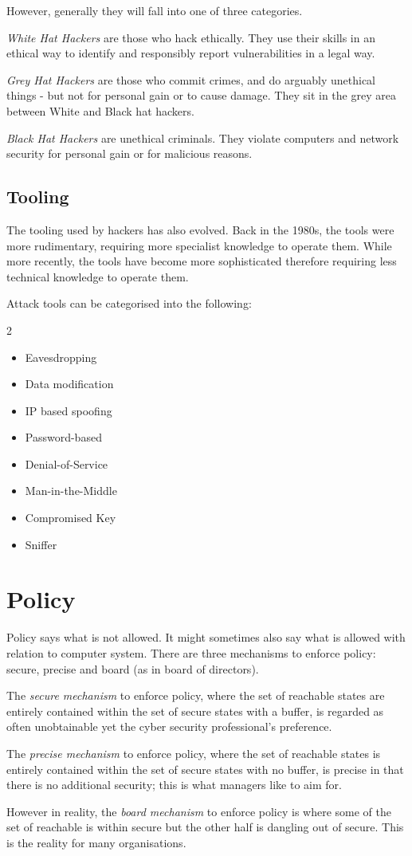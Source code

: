 However, generally they will fall into one of three categories.

\textit{White Hat Hackers} are those who hack ethically. They use their skills in an ethical way to identify and responsibly report vulnerabilities in a legal way.

\textit{Grey Hat Hackers} are those who commit crimes, and do arguably unethical things - but not for personal gain or to cause damage. They sit in the grey area between White and Black hat hackers. 

\textit{Black Hat Hackers} are unethical criminals. They violate computers and network security for personal gain or for malicious reasons.

\subsection{Tooling}
The tooling used by hackers has also evolved. Back in the 1980s, the tools were more rudimentary, requiring more specialist knowledge to operate them. While more recently, the tools have become more sophisticated therefore requiring less technical knowledge to operate them. 

Attack tools can be categorised into the following:
\begin{multicols}{2}
    \begin{itemize}
        \item Eavesdropping
        \item Data modification
        \item IP based spoofing
        \item Password-based
        \item Denial-of-Service
        \item Man-in-the-Middle
        \item Compromised Key
        \item Sniffer
    \end{itemize}
\end{multicols}

\section{Policy}
Policy says what is not allowed. It might sometimes also say what is allowed with relation to computer system. There are three mechanisms to enforce policy: secure, precise and board (as in board of directors). 

The \textit{secure mechanism} to enforce policy, where the set of reachable states are entirely contained within the set of secure states with a buffer, is regarded as often unobtainable yet the cyber security professional's preference.

The \textit{precise mechanism} to enforce policy, where the set of reachable states is entirely contained within the set of secure states with no buffer, is precise in that there is no additional security; this is what managers like to aim for.

However in reality, the \textit{board mechanism} to enforce policy is where some of the set of reachable is within secure but the other half is dangling out of secure. This is the reality for many organisations. 